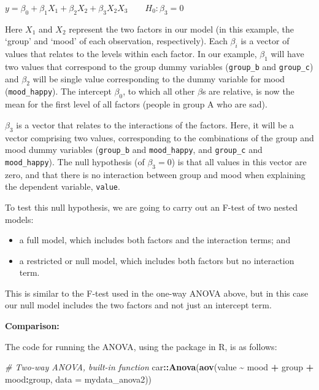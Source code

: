 \documentclass[
  12pt,
]{krantz}
\newenvironment{Shaded}{\begin{snugshade}}{\end{snugshade}}
\newcommand{\CommentTok}[1]{\textcolor[rgb]{0.56,0.35,0.01}{\textit{#1}}}
\newcommand{\DataTypeTok}[1]{\textcolor[rgb]{0.13,0.29,0.53}{#1}}
\newcommand{\KeywordTok}[1]{\textcolor[rgb]{0.13,0.29,0.53}{\textbf{#1}}}
\newcommand{\NormalTok}[1]{#1}
\newcommand{\OperatorTok}[1]{\textcolor[rgb]{0.81,0.36,0.00}{\textbf{#1}}}
\newcommand{\StringTok}[1]{\textcolor[rgb]{0.31,0.60,0.02}{#1}}
\providecommand{\tightlist}{%
  \setlength{\itemsep}{0pt}\setlength{\parskip}{0pt}}
\begin{document}
\begin{center}

\(y = \beta_0 + \beta_1 X_1 + \beta_2 X_2 + \beta_3 X_2 X_3 \qquad H_0: \beta_3 = 0\)

\end{center}

Here \(X_1\) and \(X_2\) represent the two factors in our model (in this example, the `group' and `mood' of each observation, respectively). Each \(\beta_i\) is a vector of values that relates to the levels within each factor. In our example, \(\beta_1\) will have two values that correspond to the group dummy variables (\texttt{group\_b} and \texttt{group\_c}) and \(\beta_2\) will be single value corresponding to the dummy variable for mood (\texttt{mood\_happy}). The intercept \(\beta_0\), to which all other \(\beta\)s are relative, is now the mean for the first level of all factors (people in group A who are sad).

\(\beta_3\) is a vector that relates to the interactions of the factors. Here, it will be a vector comprising two values, corresponding to the combinations of the group and mood dummy variables (\texttt{group\_b} and \texttt{mood\_happy}, and \texttt{group\_c} and \texttt{mood\_happy}). The null hypothesis (of \(\beta_3 = 0\)) is that all values in this vector are zero, and that there is no interaction between group and mood when explaining the dependent variable, \texttt{value}.

To test this null hypothesis, we are going to carry out an F-test of two nested models:

\begin{itemize}
\tightlist
\item
  a full model, which includes both factors and the interaction terms; and
\item
  a restricted or null model, which includes both factors but no interaction term.
\end{itemize}

This is similar to the F-test used in the one-way ANOVA above, but in this case our null model includes the two factors and not just an intercept term.

\textbf{Comparison:}

The code for running the ANOVA, using the package in R, is as follows:

\begin{Shaded}
\begin{Highlighting}[]
\CommentTok{\# Two{-}way ANOVA, built{-}in function}
\NormalTok{car}\OperatorTok{::}\KeywordTok{Anova}\NormalTok{(}\KeywordTok{aov}\NormalTok{(value }\OperatorTok{\textasciitilde{}}\StringTok{ }\NormalTok{mood }\OperatorTok{+}\StringTok{ }\NormalTok{group }\OperatorTok{+}\StringTok{ }\NormalTok{mood}\OperatorTok{:}\NormalTok{group, }\DataTypeTok{data =}\NormalTok{ mydata\_anova2))}
\end{Highlighting}
\end{Shaded}
\end{document}
